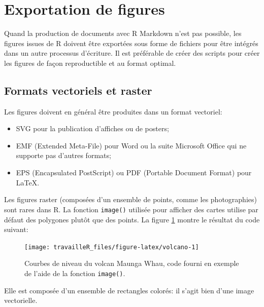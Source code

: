 \documentclass[
  12pt,
  french,
  a4paper,
  extrafontsizes,onecolumn,openright
  ]{memoir}
\providecommand{\tightlist}{%
  \setlength{\itemsep}{0pt}\setlength{\parskip}{0pt}}
\begin{document}
\normalsize

\section{Exportation de figures}\label{exportation-de-figures}

Quand la production de documents avec R Markdown n'est pas possible, les figures issues de R doivent être exportées sous forme de fichiers pour être intégrés dans un autre processus d'écriture.
Il est préférable de créer des scripts pour créer les figures de façon reproductible et au format optimal.

\subsection{Formats vectoriels et raster}\label{formats-vectoriels-et-raster}

Les figures doivent en général être produites dans un format vectoriel:

\begin{itemize}
\tightlist
\item
  SVG pour la publication d'affiches ou de posters;
\item
  EMF (Extended Meta-File) pour Word ou la suite Microsoft Office qui ne supporte pas d'autres formats;
\item
  EPS (Encapsulated PostScript) ou PDF (Portable Document Format) pour LaTeX.
\end{itemize}

Les figures raster (composées d'un ensemble de points, comme les photographies) sont rares dans R.
La fonction \texttt{image()} utilisée pour afficher des cartes utilise par défaut des polygones plutôt que des points.
La figure \ref{fig:volcano} montre le résultat du code suivant:



\scriptsize

\begin{figure}

{\centering \texttt{[image: travailleR\_files/figure-latex/volcano-1]} 

}

\caption{Courbes de niveau du volcan Maunga Whau, code fourni en exemple de l'aide de la fonction \texttt{image()}.}\label{fig:volcano}
\end{figure}

\normalsize

Elle est composée d'un ensemble de rectangles colorés: il s'agit bien d'une image vectorielle.
\end{document}
